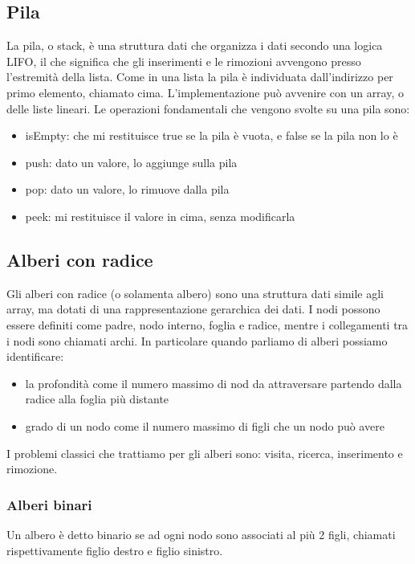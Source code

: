 \documentclass[11pt, oneside]{article}   	%
\begin{document}
\subsection{Pila}
La pila, o stack, è una struttura dati che organizza i dati secondo una logica LIFO, il che significa che gli inserimenti e le rimozioni avvengono presso l'estremità della lista. Come in una lista la pila è individuata dall'indirizzo per primo elemento, chiamato cima. L'implementazione può avvenire con un array, o delle liste lineari. Le operazioni fondamentali che vengono svolte su una pila sono:
\begin{itemize}
\item isEmpty: che mi restituisce true se la pila è vuota, e false se la pila non lo è
\item push: dato un valore, lo aggiunge sulla pila
\item pop: dato un valore, lo rimuove dalla pila
\item peek: mi restituisce il valore in cima, senza modificarla
\end{itemize}

\subsection{Alberi con radice}
Gli alberi con radice (o solamenta albero) sono una struttura dati simile agli array, ma dotati di una rappresentazione gerarchica dei dati. I nodi possono essere definiti come padre, nodo interno, foglia e radice, mentre i collegamenti tra i nodi sono chiamati archi. In particolare quando parliamo di alberi possiamo identificare:
\begin{itemize}
\item la profondità come il numero massimo di nod da attraversare partendo dalla radice alla foglia più distante
\item grado di un nodo come il numero massimo di figli che un nodo può avere
\end{itemize}
I problemi classici che trattiamo per gli alberi sono: visita, ricerca, inserimento e rimozione. 
\subsubsection{Alberi binari}
Un albero è detto binario se ad ogni nodo sono associati al più 2 figli, chiamati rispettivamente figlio destro e figlio sinistro. 
\end{document}
